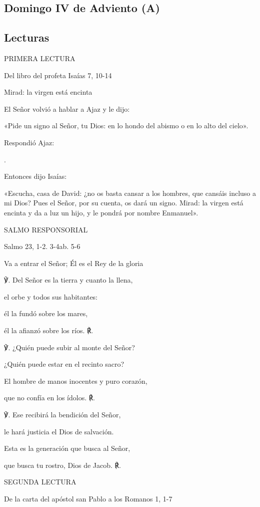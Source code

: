 \begin{body}
\begin{body}
\chapter{Domingo IV de Adviento (A)}

\section{Lecturas}

PRIMERA LECTURA

Del libro del profeta Isaías 7, 10-14

Mirad: la virgen está encinta

El Señor volvió a hablar a Ajaz y le dijo:

«Pide un signo al Señor, tu Dios: en lo hondo del abismo o en lo alto
del cielo».

Respondió Ajaz:

.

Entonces dijo Isaías:

«Escucha, casa de David: ¿no os basta cansar a los hombres, que cansáis
incluso a mi Dios? Pues el Señor, por su cuenta, os dará un signo.
Mirad: la virgen está encinta y da a luz un hijo, y le pondrá por nombre
Enmanuel».

SALMO RESPONSORIAL

Salmo 23, 1-2. 3-4ab. 5-6

Va a entrar el Señor; Él es el Rey de la gloria

℣. Del Señor es la tierra y cuanto la llena,

el orbe y todos sus habitantes:

él la fundó sobre los mares,

él la afianzó sobre los ríos. ℟.

℣. ¿Quién puede subir al monte del Señor?

¿Quién puede estar en el recinto sacro?

El hombre de manos inocentes y puro corazón,

que no confía en los ídolos. ℟.

℣. Ese recibirá la bendición del Señor,

le hará justicia el Dios de salvación.

Esta es la generación que busca al Señor,

que busca tu rostro, Dios de Jacob. ℟.

SEGUNDA LECTURA

De la carta del apóstol san Pablo a los Romanos 1, 1-7


\end{body}
\end{body}
